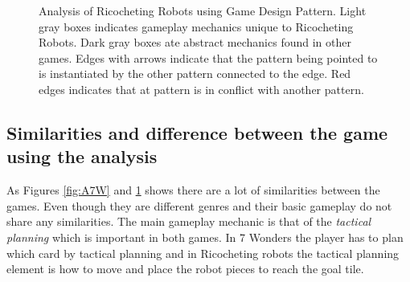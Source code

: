 \documentclass[a4paper]{article}
\begin{document}
\begin{figure}[htb]

  \caption{Analysis of Ricocheting Robots using Game Design Pattern. Light gray boxes indicates gameplay mechanics unique to Ricocheting Robots. Dark gray boxes ate abstract mechanics found in other games. Edges with arrows indicate that the pattern being pointed to is instantiated by the other pattern connected to the edge. Red edges indicates that at pattern is in conflict with another pattern.} 
  \label{fig:RRW}
\end{figure}


\subsection{Similarities and difference between the game using the analysis}
  As Figures \ref{fig:A7W} and \ref{fig:RRW} shows there are a lot of similarities between the games. 
  Even though they are different genres and their basic gameplay do not share any similarities. 
  The main gameplay mechanic is that of the \textit{tactical planning} which is important in both games. 
  In 7 Wonders the player has to plan which card by tactical planning and in Ricocheting robots the tactical planning element is how to move and place the robot pieces to reach the goal tile. 
\end{document}
